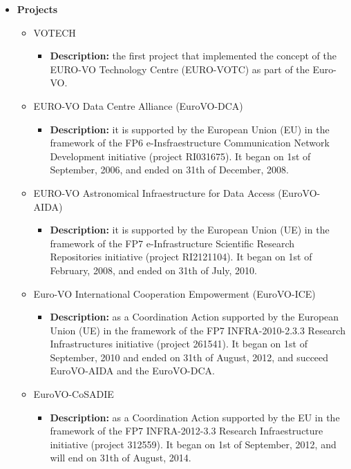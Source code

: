 \begin{itemize}
\item \textbf{Projects}
\begin{itemize}
\item VOTECH
\begin{itemize}
\item \textbf{Description:} the first project that implemented the concept of
the EURO-VO Technology Centre (EURO-VOTC) as part of the Euro-VO.
\end{itemize}
\item EURO-VO Data Centre Alliance (EuroVO-DCA)
\begin{itemize}
\item \textbf{Description:} it is supported by the European Union (EU) in the
framework of the FP6 e-Insfraestructure Communication Network Development
initiative (project RI031675). It began on 1st of September, 2006, and ended on
31th of December, 2008.
\end{itemize}
\item EURO-VO Astronomical Infraestructure for Data Access (EuroVO-AIDA)
\begin{itemize}
\item \textbf{Description:} it is supported by the European Union (UE) in the
framework of the FP7 e-Infrastructure Scientific Research Repositories
initiative (project RI2121104). It began on 1st of February, 2008, and ended on
31th of July, 2010.
\end{itemize}
\item Euro-VO International Cooperation Empowerment (EuroVO-ICE)
\begin{itemize}
\item \textbf{Description:} as a Coordination Action supported by the European
Union (UE) in the framework of the FP7 INFRA-2010-2.3.3 Research Infrastructures
initiative (project 261541). It began on 1st of September, 2010 and ended on
31th of August, 2012, and succeed EuroVO-AIDA and the EuroVO-DCA.
\end{itemize}
\item EuroVO-CoSADIE
\begin{itemize}
\item \textbf{Description:} as a Coordination Action supported by the EU in the
framework of the FP7 INFRA-2012-3.3 Research Infraestructure initiative (project
312559). It began on 1st of September, 2012, and will end on 31th of August,
2014.
\end{itemize}
\end{itemize}
\end{itemize}

